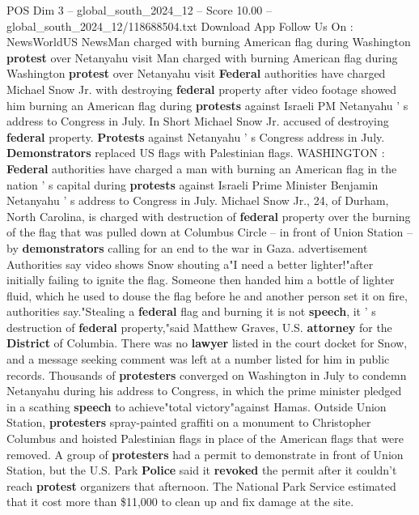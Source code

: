 \begin{textsample}{POS Dim 3 – global\_south\_2024\_12 – Score 10.00 – global\_south\_2024\_12/118688504.txt}  \label{ex:f3_pos_389}
Download App Follow Us On : NewsWorldUS NewsMan charged with burning American flag during Washington \textbf{protest} over Netanyahu visit Man charged with burning American flag during Washington \textbf{protest} over Netanyahu visit \textbf{Federal} authorities have charged Michael Snow Jr. with destroying \textbf{federal} property after video footage showed him burning an American flag during \textbf{protests} against Israeli PM Netanyahu ' s address to Congress in July.
In Short Michael Snow Jr. accused of destroying \textbf{federal} property. \textbf{Protests} against Netanyahu ' s Congress address in July. \textbf{Demonstrators} replaced US flags with Palestinian flags.
WASHINGTON : \textbf{Federal} authorities have charged a man with burning an American flag in the nation ' s capital during \textbf{protests} against Israeli Prime Minister Benjamin Netanyahu ' s address to Congress in July.
Michael Snow Jr., 24, of Durham, North Carolina, is charged with destruction of \textbf{federal} property over the burning of the flag that was pulled down at Columbus Circle -- in front of Union Station -- by \textbf{demonstrators} calling for an end to the war in Gaza. advertisement Authorities say video shows Snow shouting a"I need a better lighter!"after initially failing to ignite the flag.
Someone then handed him a bottle of lighter fluid, which he used to douse the flag before he and another person set it on fire, authorities say."Stealing a \textbf{federal} flag and burning it is not \textbf{speech}, it ' s destruction of \textbf{federal} property,"said Matthew Graves, U.S. \textbf{attorney} for the \textbf{District} of Columbia.
There was no \textbf{lawyer} listed in the court docket for Snow, and a message seeking comment was left at a number listed for him in public records.
Thousands of \textbf{protesters} converged on Washington in July to condemn Netanyahu during his address to Congress, in which the prime minister pledged in a scathing \textbf{speech} to achieve"total victory"against Hamas.
Outside Union Station, \textbf{protesters} spray-painted graffiti on a monument to Christopher Columbus and hoisted Palestinian flags in place of the American flags that were removed.
A group of \textbf{protesters} had a permit to demonstrate in front of Union Station, but the U.S.
Park \textbf{Police} said it \textbf{revoked} the permit after it couldn't reach \textbf{protest} organizers that afternoon.
The National Park Service estimated that it cost more than \$11,000 to clean up and fix damage at the site.

\end{textsample}
